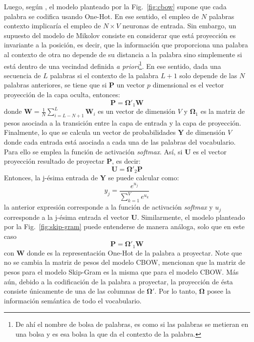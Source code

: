 Luego, según \cite{rong2014word2vec}, el modelo planteado por la Fig.~\ref{fig:cbow} supone que cada palabra se codifica usando One-Hot. En ese sentido, el empleo de $N$ palabras contexto implicaría el empleo de $N\times V$ neuronas de entrada. Sin embargo, un supuesto del modelo de Mikolov consiste en considerar que está proyección es invariante a la posición, es decir, que la información que proporciona una palabra al contexto de otra no depende de su distancia a la palabra sino simplemente si está dentro de una vecindad definida \textit{a priori}\footnote{De ahí el nombre de bolsa de palabras, es como si las palabras se metieran en una bolsa y es esa bolsa la que da el contexto de la palabra.}. En ese sentido, dada una secuencia de $L$ palabras si el contexto de la palabra $L+1$ solo depende de las $N$ palabras anteriores, se tiene que si $\mathbf{P}$ un vector $p$ dimensional es el vector proyección de la capa oculta, entonces:
$$\mathbf{P} = \mathbf{\Omega}'_1 \mathbf{W} $$
donde $\mathbf{W} = \frac{1}{N}\sum_{i=L-N+1}^{L}\mathbf{W}_i$ es un vector de dimensión $V$ y $\mathbf{\Omega}_1$ es la matriz de pesos asociada a la transición entre la capa de entrada y la capa de proyección. Finalmente, lo que se calcula un vector de probabilidades $\mathbf{Y}$ de dimensión $V$ donde cada entrada está asociada a cada una de las palabras del vocabulario. Para ello se emplea la función de activación \textit{softmax}. Así, si $\mathbf{U}$ es el vector proyección resultado de proyectar $\mathbf{P}$, es decir:
$$\mathbf{U} = \mathbf{\Omega}'_2 \mathbf{P} $$
Entonces, la j-ésima entrada de $\mathbf{Y}$ se puede calcular como:
$$y_j = \frac{e^{u_j}}{\sum_{k=1}^{V}e^{u_k}} $$
la anterior expresión corresponde a la función de activación \textit{softmax} y $u_j$ corresponde a la j-ésima entrada el vector $\mathbf{U}$. Similarmente, el modelo planteado por la Fig.~\ref{fig:skip-gram} puede entenderse de manera análoga, solo que en este caso 
$$\mathbf{P} = \mathbf{\Omega}'_1 \mathbf{W} $$
con $\mathbf{W}$ donde es la representación One-Hot de la palabra a proyectar. Note que no se cambia la matriz de pesos del modelo CBOW, \cite{goldberg2014word2vec} mencionan que la matriz de pesos para el modelo Skip-Gram es la misma que para el modelo CBOW. Más aún, debido a la codificación de la palabra a proyectar, la proyección de ésta consiste únicamente de una de las columnas de $\mathbf{\Omega}'$. Por lo tanto, $\mathbf{\Omega}$ posee la información semántica de todo el vocabulario.

